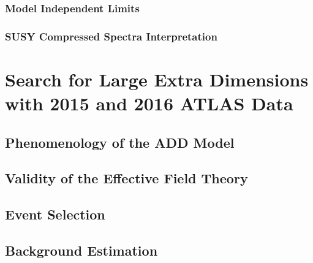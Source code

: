 \documentclass[10pt,twoside,cucitura,classica,openany]{toptesi}
\begin{document}


\subsection{Model Independent Limits}
\label{sec:model-indep-limits}



\subsection{SUSY Compressed Spectra Interpretation}
\label{sec:interpretation}



\chapter{Search for Large Extra Dimensions with 2015 and 2016 ATLAS Data}
\label{cha:2016-monoj-analys}



\section{Phenomenology of the ADD Model}
\label{sec:phen-add-model}



\section{Validity of the Effective Field Theory}
\label{sec:valid-effect-field}



\section{Event Selection}
\label{sec:event-selection-1}




% 

\section{Background Estimation}
\label{sec:backgr-estim}
\end{document}
